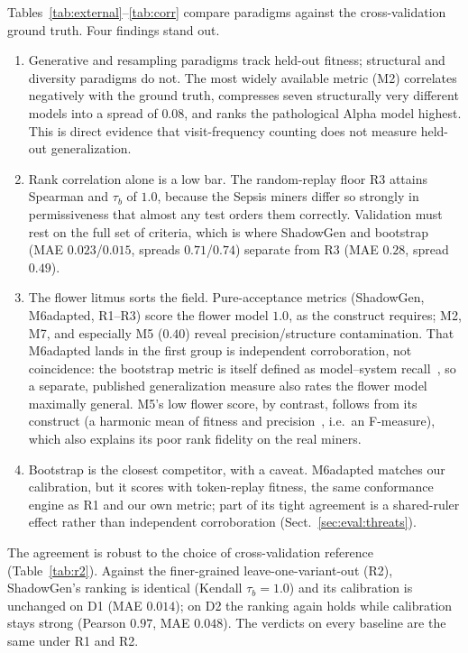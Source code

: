 \documentclass[runningheads]{llncs}
\newcommand{\chg}[1]{\textcolor{chgblue}{#1}}
\begin{document}
Tables~\ref{tab:external}--\ref{tab:corr} compare paradigms against the cross-validation ground truth. Four findings stand out.
\begin{enumerate}
  \item Generative and resampling paradigms track held-out fitness; structural and diversity paradigms do not. The most widely available metric (M2) correlates negatively with the ground truth, compresses seven structurally very different models into a spread of $0.08$, and ranks the pathological Alpha model highest. This is direct evidence that visit-frequency counting does not measure held-out generalization.
  \item Rank correlation alone is a low bar. The random-replay floor R3 attains Spearman and $\tau_b$ of $1.0$, because the Sepsis miners differ so strongly in permissiveness that almost any test orders them correctly. Validation must rest on the full set of criteria, which is where \chg{ShadowGen} and bootstrap (MAE $0.023$/$0.015$, spreads $0.71$/$0.74$) separate from R3 (MAE $0.28$, spread $0.49$).
  \item The flower litmus sorts the field. Pure-acceptance metrics (\chg{ShadowGen}, M6adapted, R1--R3) score the flower model $1.0$, as the construct requires; M2, M7, and especially M5 ($0.40$) reveal precision/structure contamination. That M6adapted lands in the first group is independent corroboration, not coincidence: the bootstrap metric is itself defined as model--system recall~\cite{polyvyanyy2022bootstrap}, so a separate, published generalization measure also rates the flower model maximally general. M5's low flower score, by contrast, follows from its construct (a harmonic mean of fitness and precision~\cite{theis2020avatar}, i.e.\ an F-measure), which also explains its poor rank fidelity on the real miners.
  \item Bootstrap is the closest competitor, with a caveat. M6adapted matches our calibration, but it scores with token-replay fitness, the same conformance engine as R1 and our own metric; part of its tight agreement is a shared-ruler effect rather than independent corroboration (Sect.~\ref{sec:eval:threats}).
\end{enumerate}

The agreement is robust to the choice of cross-validation reference (Table~\ref{tab:r2}). Against the finer-grained leave-one-variant-out (R2), ShadowGen's ranking is identical (Kendall $\tau_b{=}1.0$) and its calibration is unchanged on D1 (MAE $0.014$); on D2 the ranking again holds while calibration stays strong (Pearson $0.97$, MAE $0.048$). The verdicts on every baseline are the same under R1 and R2.
\end{document}
